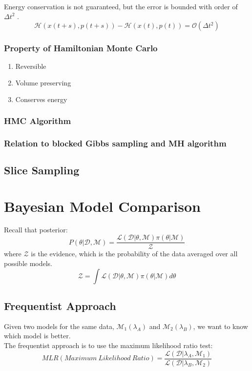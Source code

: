 \documentclass[12pt,a4paper]{article}
\begin{document}
Energy conservation is not guaranteed, but the error is bounded with order of $\Delta t^2$ .\\
$$
\mathcal{H}(x(t+s),p(t+s)) - \mathcal{H}(x(t),p(t)) = \mathcal{O}(\Delta t^2) 
$$


\subsubsection{Property of Hamiltonian Monte Carlo}
\begin{enumerate}
    \item Reversible
    \item Volume preserving
    \item Conserves energy
\end{enumerate}

\subsubsection{HMC Algorithm}

\subsubsection{Relation to blocked Gibbs sampling and MH algorithm}

\subsection{Slice Sampling}

\section{Bayesian Model Comparison}
Recall that posterior:
$$
    P(\theta|\mathcal{D}, \mathcal{M}) = \frac{\mathcal{L}(\mathcal{D}|\theta, \mathcal{M}){\pi}(\theta|\mathcal{M})}{\mathcal{Z}}
$$
where $\mathcal{Z}$ is the evidence, which is the probability of the data averaged over all possible models.\\
$$
    \mathcal{Z} = \int \mathcal{L}(\mathcal{D}|\theta, \mathcal{M}){\pi}(\theta|\mathcal{M}) d\theta
$$

\subsection{Frequentist Approach}
Given two models for the same data, $\mathcal{M}_1(\lambda_A)$ and $\mathcal{M}_2(\lambda_B)$, we want to know which model is better.\\
The frequentist approach is to use the maximum likelihood ratio test:
$$
    MLR(Maximum\ Likelihood\ Ratio) = \frac{\mathcal{L}(\mathcal{D}|\lambda_A, \mathcal{M}_1)}{\mathcal{L}(\mathcal{D}|\lambda_B, \mathcal{M}_2)}
$$
\end{document}
